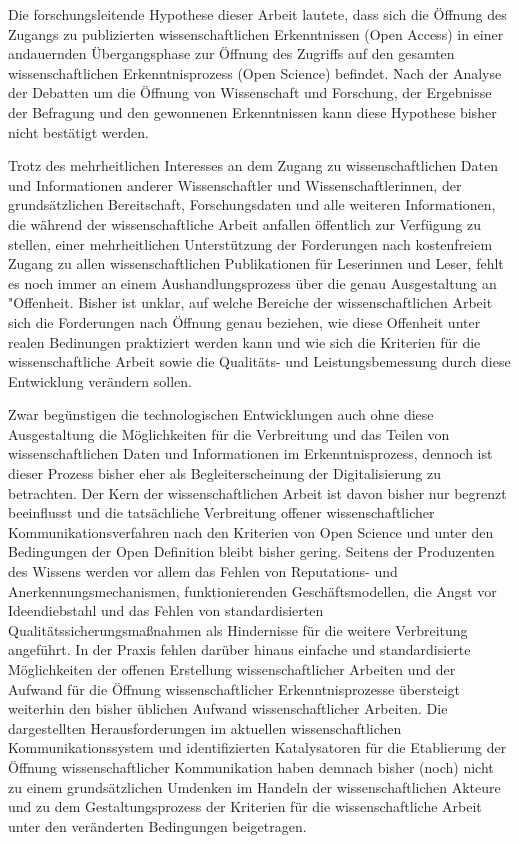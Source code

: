 Die forschungsleitende Hypothese dieser Arbeit lautete, dass sich die Öffnung des Zugangs zu publizierten wissenschaftlichen Erkenntnissen (Open Access) in einer andauernden Übergangsphase zur Öffnung des Zugriffs auf den gesamten wissenschaftlichen Erkenntnisprozess (Open Science) befindet. Nach der Analyse der Debatten um die Öffnung von Wissenschaft und Forschung, der Ergebnisse der Befragung und den gewonnenen Erkenntnissen kann diese Hypothese bisher nicht bestätigt werden.

Trotz des mehrheitlichen Interesses an dem Zugang zu wissenschaftlichen Daten und Informationen anderer Wissenschaftler und Wissenschaftlerinnen, der grundsätzlichen Bereitschaft, Forschungsdaten und alle weiteren Informationen, die während der wissenschaftliche Arbeit anfallen öffentlich zur Verfügung zu stellen, einer mehrheitlichen Unterstützung der Forderungen nach kostenfreiem Zugang zu allen wissenschaftlichen Publikationen für Leserinnen und Leser, fehlt es noch immer an einem Aushandlungsprozess über die genau Ausgestaltung an "Offenheit. Bisher ist unklar, auf welche Bereiche der wissenschaftlichen Arbeit sich die Forderungen nach Öffnung genau beziehen, wie diese Offenheit unter realen Bedinungen praktiziert werden kann und wie sich die Kriterien für die wissenschaftliche Arbeit sowie die Qualitäts- und Leistungsbemessung durch diese Entwicklung verändern sollen.

Zwar begünstigen die technologischen Entwicklungen auch ohne diese Ausgestaltung die Möglichkeiten für die Verbreitung und das Teilen von wissenschaftlichen Daten und Informationen im Erkenntnisprozess, dennoch ist dieser Prozess bisher eher als Begleiterscheinung der Digitalisierung zu betrachten. Der Kern der wissenschaftlichen Arbeit ist davon bisher nur begrenzt beeinflusst und die tatsächliche Verbreitung offener wissenschaftlicher Kommunikationsverfahren nach den Kriterien von Open Science und unter den Bedingungen der Open Definition bleibt bisher gering. Seitens der Produzenten des Wissens werden vor allem das Fehlen von Reputations- und Anerkennungsmechanismen, funktionierenden Geschäftsmodellen, die Angst vor Ideendiebstahl und das Fehlen von standardisierten Qualitätssicherungsmaßnahmen als Hindernisse für die weitere Verbreitung angeführt. In der Praxis fehlen darüber hinaus einfache und standardisierte Möglichkeiten der offenen Erstellung wissenschaftlicher Arbeiten und der Aufwand für die Öffnung wissenschaftlicher Erkenntnisprozesse übersteigt weiterhin den bisher üblichen Aufwand wissenschaftlicher Arbeiten. Die dargestellten Herausforderungen im aktuellen wissenschaftlichen Kommunikationssystem und identifizierten Katalysatoren für die Etablierung der Öffnung wissenschaftlicher Kommunikation haben demnach bisher (noch) nicht zu einem grundsätzlichen Umdenken im Handeln der wissenschaftlichen Akteure und zu dem Gestaltungsprozess der Kriterien für die wissenschaftliche Arbeit unter den veränderten Bedingungen beigetragen.


